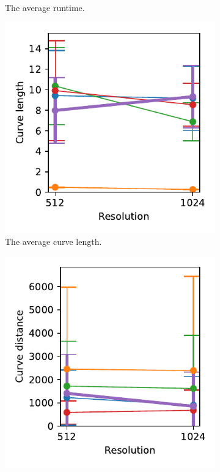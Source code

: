 \begin{figure}[!h]
\begin{subfigure}{.3\textwidth}
    \caption{The average runtime.}
\end{subfigure}
    \begin{subfigure}{.3\textwidth}
    \centering
    \includegraphics[width=\textwidth]{graphics/eval/curve length_1024-1.024_True_tonari.pdf}
    \caption{The average curve length.}
\end{subfigure}
    \begin{subfigure}{.3\textwidth}
    \centering
    \includegraphics[width=\textwidth]{graphics/eval/curve distance_1024-1.024_True_tonari.pdf}

\end{subfigure}
\end{figure}
